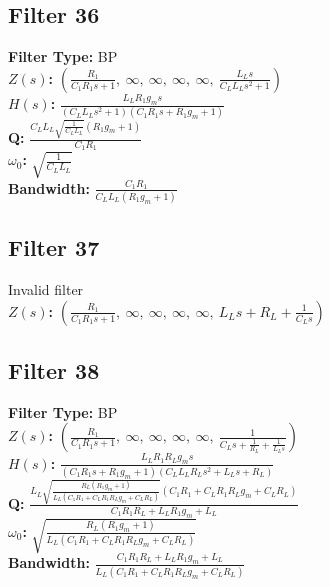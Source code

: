 \documentclass{article}
\begin{document}
\subsection*{Filter 36}
\textbf{Filter Type:} BP \\ 
\textbf{$Z(s)$:} $\left( \frac{R_{1}}{C_{1} R_{1} s + 1}, \  \infty, \  \infty, \  \infty, \  \infty, \  \frac{L_{L} s}{C_{L} L_{L} s^{2} + 1}\right)$ \\ 
\textbf{$H(s)$:} $\frac{L_{L} R_{1} g_{m} s}{\left(C_{L} L_{L} s^{2} + 1\right) \left(C_{1} R_{1} s + R_{1} g_{m} + 1\right)}$ \\ 
\textbf{Q:} $\frac{C_{L} L_{L} \sqrt{\frac{1}{C_{L} L_{L}}} \left(R_{1} g_{m} + 1\right)}{C_{1} R_{1}}$ \\ 
\textbf{$\omega_0$:} $\sqrt{\frac{1}{C_{L} L_{L}}}$ \\ 
\textbf{Bandwidth:} $\frac{C_{1} R_{1}}{C_{L} L_{L} \left(R_{1} g_{m} + 1\right)}$ \\ 
\subsection*{Filter 37}
Invalid filter \\ 
\textbf{$Z(s)$:} $\left( \frac{R_{1}}{C_{1} R_{1} s + 1}, \  \infty, \  \infty, \  \infty, \  \infty, \  L_{L} s + R_{L} + \frac{1}{C_{L} s}\right)$ \\ 
\subsection*{Filter 38}
\textbf{Filter Type:} BP \\ 
\textbf{$Z(s)$:} $\left( \frac{R_{1}}{C_{1} R_{1} s + 1}, \  \infty, \  \infty, \  \infty, \  \infty, \  \frac{1}{C_{L} s + \frac{1}{R_{L}} + \frac{1}{L_{L} s}}\right)$ \\ 
\textbf{$H(s)$:} $\frac{L_{L} R_{1} R_{L} g_{m} s}{\left(C_{1} R_{1} s + R_{1} g_{m} + 1\right) \left(C_{L} L_{L} R_{L} s^{2} + L_{L} s + R_{L}\right)}$ \\ 
\textbf{Q:} $\frac{L_{L} \sqrt{\frac{R_{L} \left(R_{1} g_{m} + 1\right)}{L_{L} \left(C_{1} R_{1} + C_{L} R_{1} R_{L} g_{m} + C_{L} R_{L}\right)}} \left(C_{1} R_{1} + C_{L} R_{1} R_{L} g_{m} + C_{L} R_{L}\right)}{C_{1} R_{1} R_{L} + L_{L} R_{1} g_{m} + L_{L}}$ \\ 
\textbf{$\omega_0$:} $\sqrt{\frac{R_{L} \left(R_{1} g_{m} + 1\right)}{L_{L} \left(C_{1} R_{1} + C_{L} R_{1} R_{L} g_{m} + C_{L} R_{L}\right)}}$ \\ 
\textbf{Bandwidth:} $\frac{C_{1} R_{1} R_{L} + L_{L} R_{1} g_{m} + L_{L}}{L_{L} \left(C_{1} R_{1} + C_{L} R_{1} R_{L} g_{m} + C_{L} R_{L}\right)}$ \\ 
\end{document}
